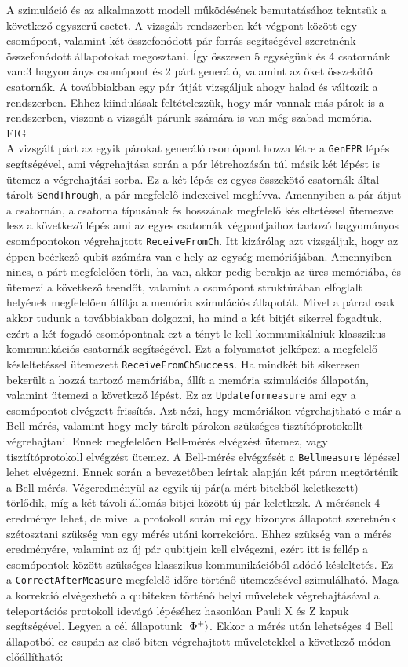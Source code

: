 A szimuláció és az alkalmazott modell működésének bemutatásához tekntsük a következő egyszerű esetet. A vizsgált rendszerben két végpont között egy csomópont, valamint két összefonódott pár forrás segítségével szeretnénk összefonódott állapotokat megosztani. Így összesen 5 egységünk és 4 csatornánk van:3 hagyománys csomópont és 2 párt generáló, valamint az őket összekötő csatornák. A továbbiakban egy pár útját vizsgáljuk ahogy halad és változik a rendszerben. Ehhez kiindulásak feltételezzük, hogy már vannak más párok is a rendszerben, viszont a vizsgált párunk számára is van még szabad memória.
\\
FIG
\\
A vizsgált párt az egyik párokat generáló csomópont hozza létre a \texttt{GenEPR} lépés segítségével, ami végrehajtása során a pár létrehozásán túl másik két lépést is ütemez a végrehajtási sorba. Ez a két lépés ez egyes összekötő csatornák által tárolt \texttt{SendThrough}, a pár megfelelő indexeivel meghívva. Amennyiben a pár átjut a csatornán, a csatorna típusának és hosszának megfelelő késleltetéssel ütemezve lesz a következő lépés ami az egyes csatornák végpontjaihoz tartozó hagyományos csomópontokon végrehajtott \texttt{ReceiveFromCh}. Itt kizárólag azt vizsgáljuk, hogy az éppen beérkező qubit számára van-e hely az egység memóriájában. Amennyiben nincs, a párt megfelelően törli, ha van, akkor pedig berakja az üres memóriába, és ütemezi a következő teendőt, valamint a csomópont struktúrában elfoglalt helyének megfelelően állítja a memória szimulációs állapotát.  Mivel a párral csak akkor tudunk a továbbiakban dolgozni, ha mind a két bitjét sikerrel fogadtuk, ezért a két fogadó csomópontnak ezt a tényt le kell kommunikálniuk klasszikus kommunikációs csatornák segítségével. Ezt a folyamatot jelképezi a megfelelő késleltetéssel ütemezett \texttt{ReceiveFromChSuccess}. Ha mindkét bit sikeresen bekerült a hozzá tartozó memóriába, állít a memória szimulációs állapotán, valamint ütemezi a következő lépést. Ez az \texttt{Updateformeasure} ami egy a csomópontot elvégzett frissítés. Azt nézi, hogy memóriákon végrehajtható-e már a Bell-mérés, valamint hogy mely tárolt párokon szükséges tisztítóprotokollt végrehajtani.
Ennek megfelelően Bell-mérés elvégzést ütemez, vagy tisztítóprotokoll elvégzést ütemez. A Bell-mérés elvégzését a \texttt{Bellmeasure} lépéssel lehet elvégezni. Ennek során a bevezetőben leírtak alapján két páron megtörténik a Bell-mérés. Végeredményül az egyik új pár(a mért bitekből keletkezett) törlődik, míg a két távoli állomás bitjei között új pár keletkezk. A mérésnek 4 eredménye lehet, de mivel a protokoll során mi egy bizonyos állapotot szeretnénk szétosztani szükség van egy mérés utáni korrekcióra. Ehhez szükség van a mérés eredményére, valamint az új pár qubitjein kell elvégezni, ezért itt is fellép a csomópontok között szükséges klasszikus kommunikációból adódó késleltetés. Ez a \texttt{CorrectAfterMeasure} megfelelő időre történő ütemezésével szimulálható. Maga a korrekció elvégezhető a qubiteken történő helyi műveletek végrehajtásával a teleportációs protokoll \cite{bennett1993teleporting} idevágó lépéséhez hasonlóan  Pauli X és Z kapuk segítségével. Legyen a cél állapotunk $\ket{\Phi^+}$. Ekkor a mérés után lehetséges 4 Bell állapotból ez csupán az első biten végrehajtott műveletekkel a következő módon előállítható:
